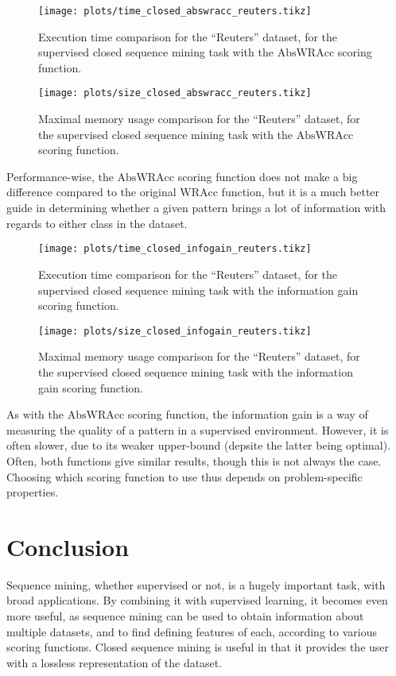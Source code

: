 \documentclass{sigkddExp}
\newcommand{\wracc}{\mathrm{WRAcc}}
\newcommand{\abswracc}{\mathrm{AbsWRAcc}}
\begin{document}
\begin{figure}[!hbtp]
	\centering
	\texttt{[image: plots/time\_closed\_abswracc\_reuters.tikz]}
	\caption{Execution time comparison for the ``Reuters'' dataset, for the supervised closed sequence mining task with the \(\abswracc\) scoring function.}
	\label{fig:time_closed_abswracc_reuters}
\end{figure}%
\begin{figure}[!hbtp]
	\centering
	\texttt{[image: plots/size\_closed\_abswracc\_reuters.tikz]}
	\caption{Maximal memory usage comparison for the ``Reuters'' dataset, for the supervised closed sequence mining task with the \(\abswracc\) scoring function.}
	\label{fig:size_closed_abswracc_reuters}
\end{figure}
Performance-wise, the \(\abswracc\) scoring function does not make a big difference compared to the original \(\wracc\) function, but it is a much better guide in determining whether a given pattern brings a lot of information with regards to either class in the dataset.

\begin{figure}[H]
	\centering
	\texttt{[image: plots/time\_closed\_infogain\_reuters.tikz]}
	\caption{Execution time comparison for the ``Reuters'' dataset, for the supervised closed sequence mining task with the information gain scoring function.}
	\label{fig:time_closed_infogain_reuters}
\end{figure}
\begin{figure}[H]
	\centering
	\texttt{[image: plots/size\_closed\_infogain\_reuters.tikz]}
	\caption{Maximal memory usage comparison for the ``Reuters'' dataset, for the supervised closed sequence mining task with the information gain scoring function.}
	\label{fig:size_closed_infogain_reuters}
\end{figure}

As with the \(\abswracc\) scoring function, the information gain is a way of measuring the quality of a pattern in a supervised environment.
However, it is often slower, due to its weaker upper-bound (depsite the latter being optimal).
Often, both functions give similar results, though this is not always the case.
Choosing which scoring function to use thus depends on problem-specific properties.

\section{Conclusion}
Sequence mining, whether supervised or not, is a hugely important task, with broad applications.
By combining it with supervised learning, it becomes even more useful, as sequence mining can be used to obtain information about multiple datasets, and to find defining features of each, according to various scoring functions.
Closed sequence mining is useful in that it provides the user with a lossless representation of the dataset.
\end{document}
